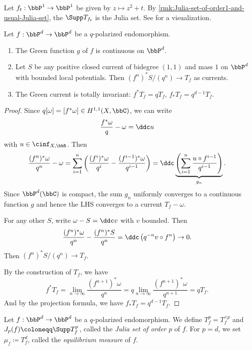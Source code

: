 \begin{example}[label=\labelNFM{eg:green-currents-of-z2+c}, status=draft, tag=0000000]
	Let $f_t: \bbP^1 \to \bbP^1$ be given by $z \mapsto z^2 + t$.
	By \cref{rmk:Julia-set-of-order1-and-usual-Julia-set}, the $\Supp T_{f_t}$ is the Julia set.
	See \cite{Graven-2026-ComplexDynamicsVisualization} for a visualization.
\end{example}

\begin{proposition}[label=\labelNFM{prop:basic-properties-of-green-currents}, status=draft, tag=0000000]
	Let $f: \bbP^d \to \bbP^d$ be a $q$-polarized endomorphism.
	\begin{enumerate}
		\item The Green function $g$ of $f$ is continuous on $\bbP^d$.
		\item Let $S$ be any positive closed current of bidegree $(1,1)$ and mass $1$ on $\bbP^d$ with bounded local potentials. Then $(f^n)^*S/(q^n) \to T_f$ as currents.
		\item The Green current is totally invariant: $f^*T_f = qT_f$, $f_*T_f = q^{d-1}T_f$.
	\end{enumerate}
\end{proposition}
\begin{proof}
	Since $q[\omega] = [f^*\omega] \in H^{1,1}(X,\bbC)$, we can write
	\[ \frac{f^*\omega}{q} - \omega = \ddc u \]
	with $u \in \cinf_{X,\bbR}$.
	Then
	\[ \frac{(f^n)^*\omega}{q^n} - \omega = \sum_{i=1}^n \left( \frac{(f^i)^*\omega}{q^i} - \frac{(f^{i-1})^*\omega}{q^{i-1}} \right) = \ddc\underbrace{\left(\sum_{i=1}^n\frac{u\circ f^{i-1}}{q^{i-1}}\right)}_{g_n}. \]
	Since $\bbP^d(\bbC)$ is compact, the sum $g_n$ uniformly converges to a continuous function $g$ and hence the LHS converges to a current $T_f - \omega$.

	For any other $S$, write $\omega - S = \ddc v$ with $v$ bounded.
	Then
	\[ \frac{(f^n)^*\omega}{q^n} - \frac{(f^n)^*S}{q^n} = \ddc\left(q^{-n}v\circ f^n\right) \to 0. \]
	Then $(f^n)^*S/(q^n) \to T_f$.

	By the construction of $T_f$, we have
	\[ f^*T_f = \lim_{n \to \infty} \frac{(f^{n+1})^*\omega}{q^{n}} = q \lim_{n \to \infty} \frac{(f^{n+1})^*\omega}{q^{n+1}} = q T_f.  \]
	And by the projection formula, we have $f_*T_f = q^{d-1}T_f$.
\end{proof}


\begin{definition}[label=\labelNFM{def:equilibrium-measure-and-julia-sets}, status=draft, tag=0000000]
	Let $f: \bbP^d \to \bbP^d$ be a $q$-polarized endomorphism.
	We define $T_f^p = T_f^{\wedge p}$ and $J_p(f) \coloneqq \Supp T_f^p$, called the \emph{Julia set of order $p$} of $f$.
	For $p = d$, we set $\mu_f \coloneqq T_f^d$, called the \emph{equilibrium measure} of $f$.
\end{definition}

